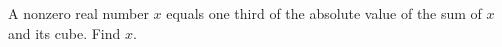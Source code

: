 A nonzero real number $x$ equals one third of the absolute value of the sum of $x$ and its cube. Find $x$.
